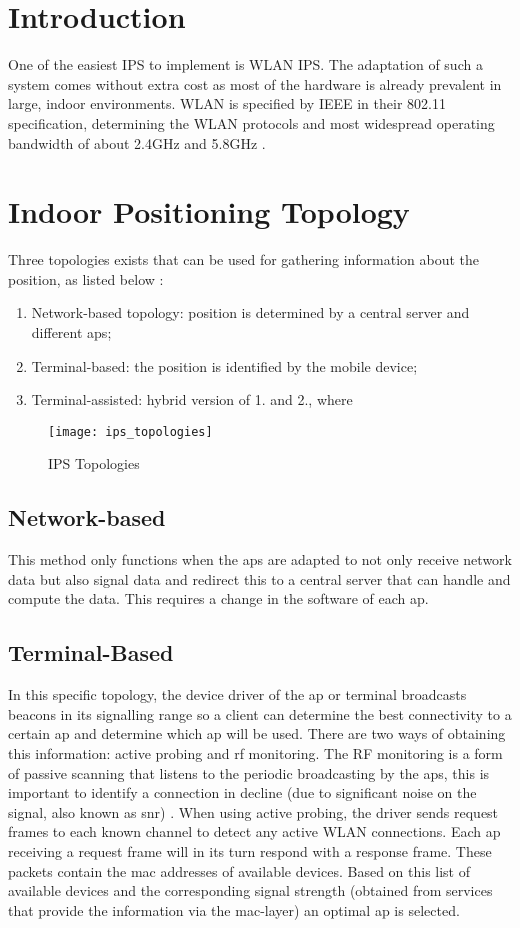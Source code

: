 \section{Introduction}
One of the easiest IPS to implement is WLAN IPS. The adaptation of such a system comes without extra cost as most of the hardware is already prevalent in large, indoor environments. 
WLAN is specified by IEEE in their 802.11 specification, determining the WLAN protocols and most widespread operating bandwidth of about 2.4GHz and 5.8GHz \cite{Techopedia} \cite{ElectronicsNotes}\cite{Cisco}. 
\section{Indoor Positioning Topology}
Three topologies exists that can be used for gathering information about the position, as listed below \cite{Henniges2012}:
\begin{enumerate}
\item Network-based topology: position is determined by a central server and different \acrshort{ap}s;
\item Terminal-based: the position is identified by the mobile device;
\item Terminal-assisted: hybrid version of 1. and 2., where 
\end{enumerate}
\begin{figure}[h!]
\centering
\texttt{[image: ips\_topologies]}
\caption{IPS Topologies ~\cite{Henniges2012}}
\label{fig:ips_topologies}
\end{figure}
\subsection{Network-based}
This method only functions when the \acrshort{ap}s are adapted to not only receive network data but also signal data and redirect this to a central server that can handle and compute the data. This requires a change in the software of each \acrlong{ap}.
\subsection{Terminal-Based}
In this specific topology, the device driver of the \acrshort{ap} or terminal broadcasts beacons in its signalling range so a client can determine the best connectivity to a certain \acrshort{ap} and determine which \acrshort{ap} will be used. There are two ways of obtaining this information: active probing and \acrshort{rf} monitoring. The RF monitoring is a form of passive scanning that listens to the periodic broadcasting by the \acrlong{ap}s, this is important to identify a connection in decline (due to significant noise on the signal, also known as \acrfull{snr}) . When using active probing, the driver sends request frames to each known channel to detect any active WLAN connections. Each \acrshort{ap} receiving a request frame will in its turn respond with a response frame. These packets contain the \acrshort{mac} addresses of available devices. Based on this list of available devices and the corresponding signal strength (obtained from services that provide the information via the \acrshort{mac}-layer) an optimal \acrshort{ap} is selected\cite[p.~8]{Retscher}.
